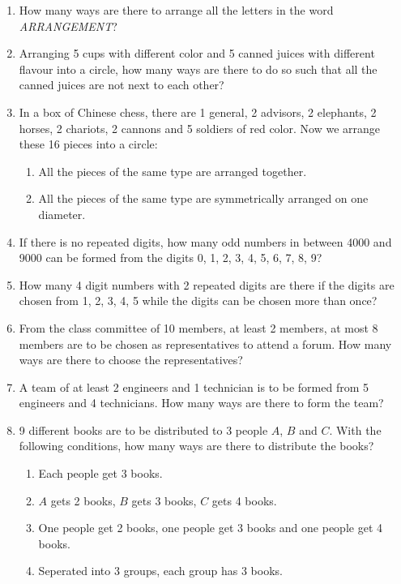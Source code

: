 \documentclass{report}
\begin{document}
\begin{multicols}{2}
\begin{enumerate}
    \item How many ways are there to arrange all the letters in the word
          \textit{ARRANGEMENT}?

    \item Arranging 5 cups with different color and 5 canned juices with different
          flavour into a circle, how many ways are there to do so such that all the
          canned juices are not next to each other?

    \item In a box of Chinese chess, there are 1 general, 2 advisors, 2 elephants, 2
          horses, 2 chariots, 2 cannons and 5 soldiers of red color. Now we arrange these
          16 pieces into a circle:
          \begin{enumerate}
            \item All the pieces of the same type are arranged together.
            \item All the pieces of the same type are symmetrically arranged on one diameter.
          \end{enumerate}

    \item If there is no repeated digits, how many odd numbers in between 4000 and 9000
          can be formed from the digits 0, 1, 2, 3, 4, 5, 6, 7, 8, 9?

    \item How many 4 digit numbers with 2 repeated digits are there if the digits are
          chosen from 1, 2, 3, 4, 5 while the digits can be chosen more than once?

    \item From the class committee of 10 members, at least 2 members, at most 8 members
          are to be chosen as representatives to attend a forum. How many ways are there
          to choose the representatives?

    \item A team of at least 2 engineers and 1 technician is to be formed from 5
          engineers and 4 technicians. How many ways are there to form the team?

    \item 9 different books are to be distributed to 3 people $A$, $B$ and $C$. With the following conditions, how many ways are there to distribute the books?
          \begin{enumerate}
            \item Each people get 3 books.
            \item $A$ gets 2 books, $B$ gets 3 books, $C$ gets 4 books.
            \item One people get 2 books, one people get 3 books and one people get 4 books.
            \item Seperated into 3 groups, each group has 3 books.
          \end{enumerate}
  \end{enumerate}


\end{multicols}
\end{document}
